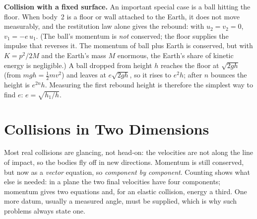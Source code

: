 \textbf{Collision with a fixed surface.} An important special case is a ball hitting the floor. When
body~2 is a floor or wall attached to the Earth, it does not move measurably, and the restitution law
alone gives the rebound: with $u_2=v_2=0$, $v_1=-e\,u_1$. (The ball's momentum is \emph{not} conserved;
the floor supplies the impulse that reverses it. The momentum of ball plus Earth is conserved, but with
$K=p^2/2M$ and the Earth's mass $M$ enormous, the Earth's share of kinetic energy is negligible.) A ball
dropped from height $h$ reaches the floor at $\sqrt{2gh}$ (from $mgh=\tfrac12mv^2$) and leaves at
$e\sqrt{2gh}$, so it rises to $e^2h$; after $n$ bounces the height is $e^{2n}h$. Measuring the first
rebound height is therefore the simplest way to find $e$: $e=\sqrt{h_1/h}$.

\section{Collisions in Two Dimensions}

Most real collisions are glancing, not head-on: the velocities are not along the line of impact, so the
bodies fly off in new directions. Momentum is still conserved, but now as a \emph{vector} equation, so
\emph{component by component}. Counting shows what else is needed: in a plane the two final velocities
have four components; momentum gives two equations and, for an elastic collision, energy a third. One
more datum, usually a measured angle, must be supplied, which is why such problems always state one.

\begin{figure}[htbp]
\centering
{}
\end{figure}

